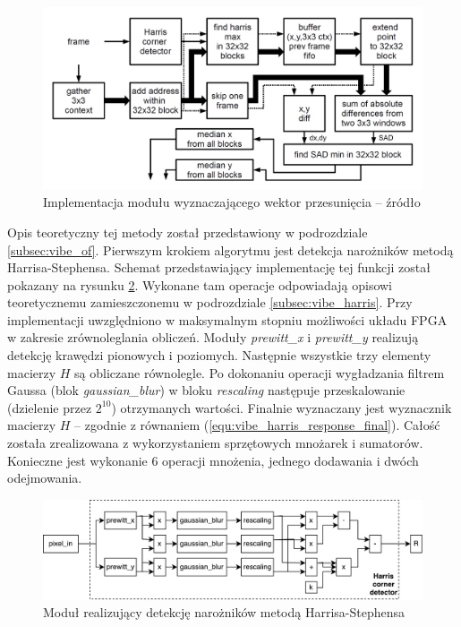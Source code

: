 	\begin{figure}[h!]
		\centering
		\includegraphics[scale=0.25]{img/4/displacement_vector_diagram.png}
		\caption{Implementacja modułu wyznaczającego wektor przesunięcia -- źródło \cite{kryjak_14_vibe}} 
		\label{fig:displacement_diagram}
	\end{figure}

Opis teoretyczny tej metody został przedstawiony w podrozdziale \ref{subsec:vibe_of}. 
Pierwszym krokiem algorytmu jest detekcja narożników metodą Harrisa-Stephensa. 
Schemat przedstawiający implementację tej funkcji został pokazany na rysunku \ref{fig:harris_diagram}. 
Wykonane tam operacje odpowiadają opisowi teoretycznemu zamieszczonemu w podrozdziale \ref{subsec:vibe_harris}. 
Przy implementacji uwzględniono w maksymalnym stopniu możliwości układu FPGA w zakresie zrównoleglania obliczeń. 
Moduły \textit{prewitt\_x} i \textit{prewitt\_y} realizują detekcję krawędzi pionowych i poziomych. 
Następnie wszystkie trzy elementy macierzy $H$ są obliczane równolegle. 
Po dokonaniu operacji wygładzania filtrem Gaussa (blok \textit{gaussian\_blur}) w bloku \textit{rescaling} następuje przeskalowanie (dzielenie przez $2^{10}$) otrzymanych wartości. 
Finalnie wyznaczany jest wyznacznik macierzy $H$ -- zgodnie z równaniem (\ref{equ:vibe_harris_response_final}). 
Całość została zrealizowana z wykorzystaniem sprzętowych mnożarek i sumatorów. 
Konieczne jest wykonanie 6 operacji mnożenia, jednego dodawania i dwóch odejmowania.
 
	\begin{figure}[h!]
		\centering
		\includegraphics[scale=0.6]{img/4/harris_detector.pdf}
		\caption{Moduł realizujący detekcję narożników metodą Harrisa-Stephensa}
		\label{fig:harris_diagram}
	\end{figure}

